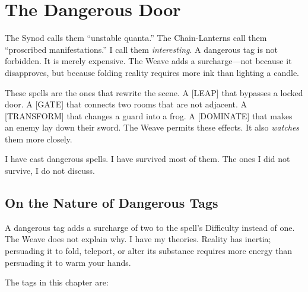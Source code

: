 \section{The Dangerous Door}

The Synod calls them ``unstable quanta.'' The Chain-Lanterns call them ``proscribed manifestations.'' I call them \emph{interesting}. A dangerous tag is not forbidden. It is merely expensive. The Weave adds a surcharge---not because it disapproves, but because folding reality requires more ink than lighting a candle.

These spells are the ones that rewrite the scene. A [LEAP] that bypasses a locked door. A [GATE] that connects two rooms that are not adjacent. A [TRANSFORM] that changes a guard into a frog. A [DOMINATE] that makes an enemy lay down their sword. The Weave permits these effects. It also \emph{watches} them more closely.

I have cast dangerous spells. I have survived most of them. The ones I did not survive, I do not discuss.

\subsection{On the Nature of Dangerous Tags}

A dangerous tag adds a surcharge of two to the spell's Difficulty instead of one. The Weave does not explain why. I have my theories. Reality has inertia; persuading it to fold, teleport, or alter its substance requires more energy than persuading it to warm your hands.

The tags in this chapter are:

